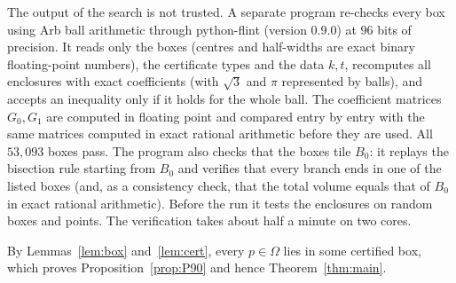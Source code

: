 \documentclass[11pt]{amsart}
\theoremstyle{definition}
\theoremstyle{remark}
\begin{document}
The output of the search is not trusted. A separate program re-checks every box using Arb ball arithmetic \cite{Joh17} through python-flint (version 0.9.0) at $96$ bits of precision. It reads only the boxes (centres and half-widths are exact binary floating-point numbers), the certificate types and the data $k,t$, recomputes all enclosures with exact coefficients (with $\sqrt3$ and $\pi$ represented by balls), and accepts an inequality only if it holds for the whole ball. The coefficient matrices $G_0,G_1$ are computed in floating point and compared entry by entry with the same matrices computed in exact rational arithmetic before they are used. All $53{,}093$ boxes pass. The program also checks that the boxes tile $B_0$: it replays the bisection rule starting from $B_0$ and verifies that every branch ends in one of the listed boxes (and, as a consistency check, that the total volume equals that of $B_0$ in exact rational arithmetic). Before the run it tests the enclosures on random boxes and points. The verification takes about half a minute on two cores.

By Lemmas~\ref{lem:box} and~\ref{lem:cert}, every $p\in\Omega$ lies in some certified box, which proves Proposition~\ref{prop:P90} and hence Theorem~\ref{thm:main}.
\end{document}
